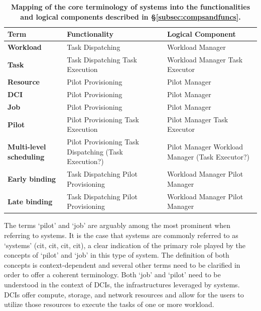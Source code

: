 \documentclass{sig-alternate}
\begin{document}
\begin{table}
 \centering
 \begin{tabular}{|p{4cm}|p{3.2cm}|p{3.2cm}|}
  \hline
    \textbf{Term} & \textbf{Functionality} & \textbf{Logical Component} \\
  \hline
  \hline
    \textbf{Workload} & Task Dispatching & Workload Manager \\
  \hline
    \textbf{Task} & Task Dispatching \newline
    Task Execution & Workload Manager \newline
    Task Executor \\
  \hline
    \textbf{Resource} & Pilot Provisioning & Pilot Manager \\
  \hline
    \textbf{DCI} & Pilot Provisioning & Pilot Manager \\
  \hline
    \textbf{Job} & Pilot Provisioning & Pilot Manager \\
  \hline
    \textbf{Pilot} & Pilot Provisioning \newline
    Task Execution & Pilot Manager \newline
    Task Executor \\
  \hline
    \textbf{Multi-level scheduling} &
    Pilot Provisioning \newline Task Dispatching \newline (Task Execution?) &
    Pilot Manager \newline Workload Manager \newline (Task Executor?) \\
  \hline
    \textbf{Early binding} & Task Dispatching \newline
    Pilot Provisioning & Workload Manager \newline
    Pilot Manager\\
  \hline
    \textbf{Late binding} & Task Dispatching \newline
    Pilot Provisioning  & Workload Manager \newline
    Pilot Manager\\
  \hline
 \end{tabular}
 \caption{\textbf{Mapping of the core terminology of \pilot systems into
  the functionalities and logical components described in
  \S\ref{subsec:compsandfuncs}.}}
 \label{table:terminology}
\end{table}

The terms `pilot' and `job' are arguably among the most prominent when
referring to \pilot systems. It is the case that \pilot systems are
commonly referred to as `\pilotjob systems' (cit, cit, cit, cit), a
clear indication of the primary role played by the concepts of `pilot'
and `job' in this type of system. The definition of both concepts is
context-dependent and several other terms need to be clarified in order
to offer a coherent terminology. Both `job' and `pilot' need to be
understood in the context of DCIs, the infrastructures leveraged by
\pilot systems. DCIs offer compute, storage, and network resources and
\pilot allow for the users to utilize those resources to execute the
tasks of one or more workload.
\end{document}
